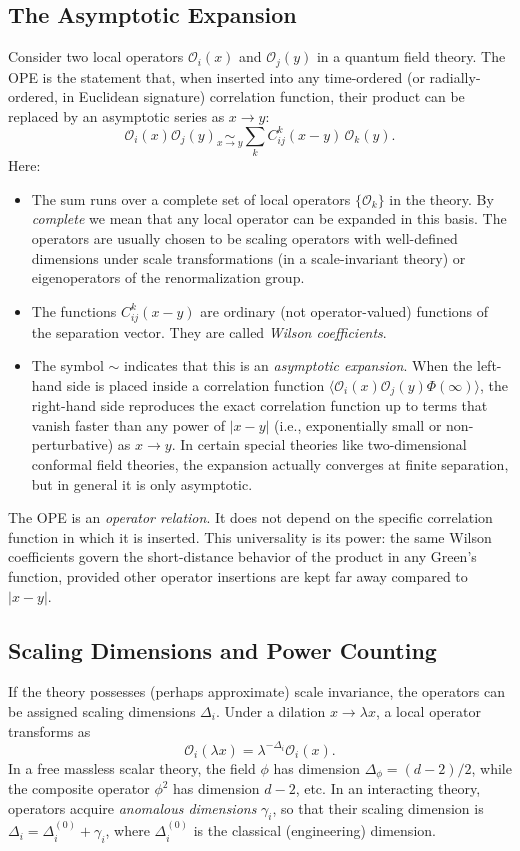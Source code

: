 \documentclass[11pt]{article}
\begin{document}
\subsection{The Asymptotic Expansion}
Consider two local operators $\mathcal{O}_i(x)$ and $\mathcal{O}_j(y)$ in a quantum field theory. The OPE is the statement that, when inserted into any time-ordered (or radially-ordered, in Euclidean signature) correlation function, their product can be replaced by an asymptotic series as $x \to y$:
\begin{equation}
\boxed{
\mathcal{O}_i(x) \mathcal{O}_j(y) \underset{x \to y}{\sim} \sum_k C_{ij}^k(x-y) \, \mathcal{O}_k(y) .
}
\label{eq:OPEdef}
\end{equation}
Here:
\begin{itemize}
    \item The sum runs over a complete set of local operators $\{\mathcal{O}_k\}$ in the theory. By \emph{complete} we mean that any local operator can be expanded in this basis. The operators are usually chosen to be scaling operators with well-defined dimensions under scale transformations (in a scale-invariant theory) or eigenoperators of the renormalization group.
    \item The functions $C_{ij}^k(x-y)$ are ordinary (not operator-valued) functions of the separation vector. They are called \emph{Wilson coefficients}.
    \item The symbol $\sim$ indicates that this is an \emph{asymptotic expansion}. When the left-hand side is placed inside a correlation function $\langle \mathcal{O}_i(x) \mathcal{O}_j(y) \Phi(\infty) \rangle$, the right-hand side reproduces the exact correlation function up to terms that vanish faster than any power of $|x-y|$ (i.e., exponentially small or non-perturbative) as $x \to y$. In certain special theories like two-dimensional conformal field theories, the expansion actually converges at finite separation, but in general it is only asymptotic.
\end{itemize}

The OPE is an \emph{operator relation}. It does not depend on the specific correlation function in which it is inserted. This universality is its power: the same Wilson coefficients govern the short-distance behavior of the product in any Green's function, provided other operator insertions are kept far away compared to $|x-y|$.

\subsection{Scaling Dimensions and Power Counting}
If the theory possesses (perhaps approximate) scale invariance, the operators can be assigned scaling dimensions $\Delta_i$. Under a dilation $x \to \lambda x$, a local operator transforms as
\[
\mathcal{O}_i(\lambda x) = \lambda^{-\Delta_i} \mathcal{O}_i(x).
\]
In a free massless scalar theory, the field $\phi$ has dimension $\Delta_\phi = (d-2)/2$, while the composite operator $\phi^2$ has dimension $d-2$, etc. In an interacting theory, operators acquire \emph{anomalous dimensions} $\gamma_i$, so that their scaling dimension is $\Delta_i = \Delta_i^{(0)} + \gamma_i$, where $\Delta_i^{(0)}$ is the classical (engineering) dimension.
\end{document}
